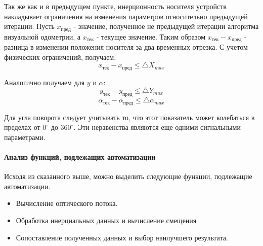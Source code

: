 \begin{enumerate}
Так же как и в предыдущем пункте, инерционность носителя устройств накладывает ограничения на изменения параметров относительно предыдущей итерации. 
Пусть $x_{пред}$ - значение, полученное не предыдущей итерации алгоритма визуальной одометрии, а  $x_{тек}$ - текущее значение. 
Таким образом $ x_{тек} - x_{пред}$ - разница в изменении положения носителя за два временных отрезка. 
С учетом физических ограничений, получаем:
$$ x_{тек} - x_{пред} \leq \bigtriangleup X_{max}$$

Аналогично получаем для $y$ и $\alpha$:
$$ y_{тек} - y_{пред} \leq \bigtriangleup Y_{max}$$
$$ \alpha_{тек} - \alpha_{пред} \leq \bigtriangleup \alpha_{max}$$

Для угла поворота следует учитывать то, что этот показатель может колебаться в пределах от $0^\circ$ до $360^\circ$.
Эти неравенства являются еще одними сигнальными параметрами.
\end{enumerate}


\paragraph{Анализ функций, подлежащих автоматизации}
Исходя из сказанного выше, можно выделить следующие функции, подлежащие автоматизации.
\begin{itemize}
\item Вычисление оптического потока.
\item Обработка инерциальных данных и вычисление смещения
\item Сопоставление полученных данных и выбор наилучшего результата. 
\end{itemize}

